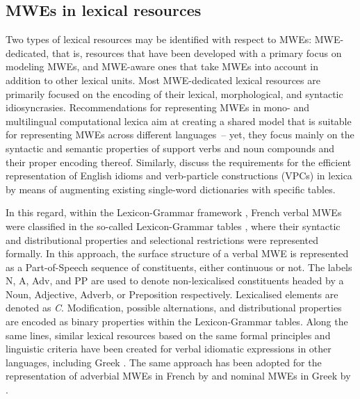 \documentclass[output=paper,colorlinks,citecolor=brown]{langscibook}
\begin{document}
\subsection{MWEs in lexical resources}
\label{subsec:MWEs-in-LRs}
Two types of lexical resources may be identified with respect to MWEs: MWE-dedicated, that is, resources that have been developed with a primary focus on modeling MWEs, and MWE-aware ones that take MWEs into account in addition to other lexical units. Most MWE-dedicated lexical resources are primarily focused on the encoding of their lexical, morphological, and syntactic idiosyncrasies. Recommendations for representing MWEs in mono- and multilingual computational lexica \citep{calzolari_etal_2002, copestake_etal_2002} aim at creating a shared model that is suitable for representing MWEs across different languages~-- yet, they focus mainly on the syntactic and semantic properties of support verbs and noun compounds and their proper encoding thereof. Similarly, \citet{villavicencio_etal_2004} discuss the requirements for the efficient representation of English idioms and verb-particle constructions (VPCs) in lexica by means of augmenting existing single-word dictionaries with specific tables.

In this regard, within the Lexicon-Grammar framework \citep{gross_methodes_1975}, French verbal MWEs were classified in the so-called Lexicon-Grammar tables \citep{gross_1982}, where their syntactic and distributional properties and selectional restrictions were represented formally. In this approach, the surface structure of a verbal MWE is represented as a Part-of-Speech sequence of constituents, either continuous or not. The labels N, A, Adv, and PP are used to denote non-lexicalised constituents headed by a Noun, Adjective, Adverb, or Preposition respectively. Lexicalised elements are denoted as \textit{C}. Modification, possible alternations, and distributional properties are encoded as binary properties within the Lexicon-Grammar tables. 
Along the same lines, similar lexical resources based on the same formal principles and linguistic criteria have been created for verbal idiomatic expressions in other languages, including Greek \citep{Fotopoulou1993, Mini2009}. The same approach has been adopted for the representation of adverbial MWEs in French by \citet{LaporteVoyatzi_2008} and nominal MWEs in Greek by \citet{Anastasiadis-Symeonidis1986}.
\end{document}
